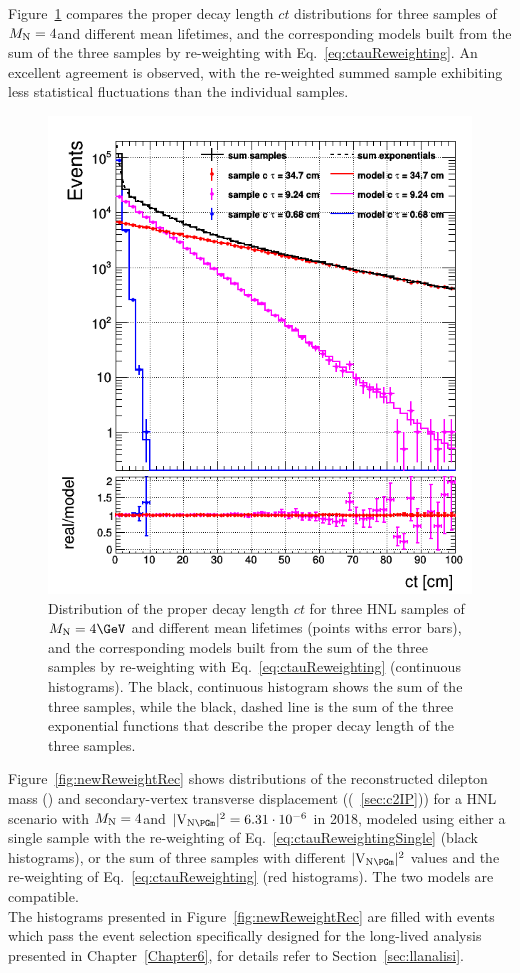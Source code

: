 Figure~\ref{fig:newReweightGen} compares the proper decay length $ct$
distributions for three samples of $M_{\mathrm{N}}=4$\GeV and different mean
lifetimes, and the corresponding models built from the sum of the
three samples by re-weighting with Eq.~\ref{eq:ctauReweighting}. An
excellent agreement is observed, with the re-weighted summed sample
exhibiting less statistical fluctuations than the individual samples.
\begin{figure}[h!]
  \centering
  \includegraphics[width = .55\textwidth]{Figures/c4/reweighting/ctau_genLevel_unskimmed.png}
  \caption{Distribution of the proper decay length $ct$ for three HNL
    samples of $\mhnl=4\GeV$ and different mean lifetimes (points withs
    error bars),
    and the corresponding models built from the sum of the three
    samples by re-weighting with Eq.~\ref{eq:ctauReweighting}
    (continuous histograms). The black, continuous histogram shows the
    sum of the three samples, while the black, dashed line is the sum
    of the three exponential functions that describe the proper decay
    length of the three samples. \dani}
  \label{fig:newReweightGen}
\end{figure}


Figure~\ref{fig:newReweightRec} shows distributions of the
reconstructed dilepton mass (\mtwol) and secondary-vertex transverse
displacement (\Deltwod (~\ref{sec:c2IP})) for a HNL scenario with
$M_{\mathrm{N}}=4$\GeV and $\mixparm = 6.31\cdot 10^{-6}$ in 2018,
modeled using either a single sample with the re-weighting of
Eq.~\ref{eq:ctauReweightingSingle} (black histograms), or the sum of
three samples with different $\mixparm$ values and the re-weighting of
Eq.~\ref{eq:ctauReweighting} (red histograms). The two models are compatible.\\
The histograms
presented in Figure~\ref{fig:newReweightRec} are filled with events
which pass the event selection specifically designed for the
long-lived analysis presented in Chapter~\ref{Chapter6}, for details
refer to Section~\ref{sec:llanalisi}. 


